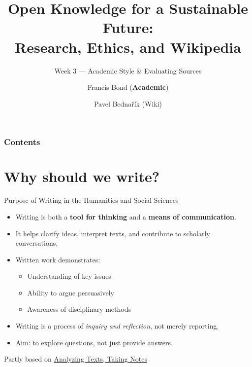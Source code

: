 \documentclass[aspectratio=169]{beamer}
\title[Academic Style \& Sources]{Open Knowledge for a Sustainable Future:\\ Research, Ethics, and Wikipedia}
\subtitle{Week 3  — Academic Style  \& Evaluating Sources}
\author[Bond \& Bednařík]{Francis Bond (\textbf{Academic}) \and Pavel Bednařík (Wiki)}
\institute[UPOL \& Wikimedia]{Palacký University Olomouc \quad | \quad Wikimedia ČR}
\date{}
\begin{document}
\begin{frame}
  \titlepage
\end{frame}

\begin{frame}
  \frametitle{Contents}
  \small
  \tableofcontents[hideallsubsections]
\end{frame}


\section{Why should we write?}

\begin{frame}{Purpose of Writing in the Humanities and Social Sciences}
\begin{itemize}
  \item Writing is both a \textbf{tool for thinking} and a \textbf{means of communication}.
  \item It helps clarify ideas, interpret texts, and contribute to scholarly conversations.
  \item Written work demonstrates:
    \begin{itemize}
      \item Understanding of key issues
      \item Ability to argue persuasively
      \item Awareness of disciplinary methods
    \end{itemize}
  \item Writing is a process of \emph{inquiry and reflection}, not merely reporting.
  \item Aim: to explore questions, not just provide answers.
\end{itemize}
\vfill
Partly based on \href{https://mlpp.pressbooks.pub/writinghandbook/chapter/chapter-1/}{Analyzing Texts, Taking Notes} \citep[Ch.~1]{writinghandbook}
\end{frame}
\end{document}
